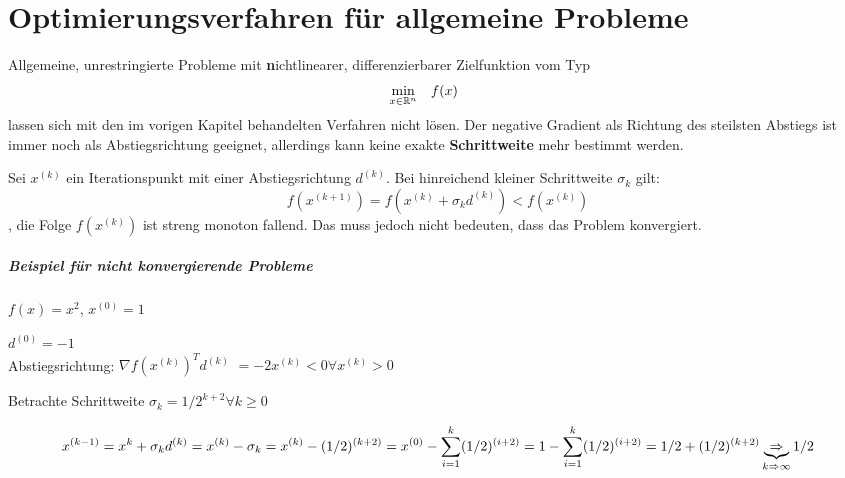 \chapter{Optimierungsverfahren für allgemeine Probleme}

Allgemeine, unrestringierte Probleme mit \textbf nichtlinearer, differenzierbarer Zielfunktion vom Typ
\begin{equation}
			\begin{aligned}
				\min_{x\in\mathbb R^n}
				& & & f(x) & & &
			\end{aligned}
\end{equation}
lassen sich mit den im vorigen Kapitel behandelten Verfahren nicht lösen. Der negative Gradient als Richtung des steilsten Abstiegs ist immer noch als Abstiegsrichtung geeignet, allerdings kann keine exakte \textbf {Schrittweite} mehr bestimmt werden.

Sei $x^{(k)}$ ein Iterationspunkt mit einer Abstiegsrichtung $d^{(k)}$. Bei hinreichend kleiner Schrittweite $\sigma_k$ gilt:
\begin{equation}
	f(x^{(k+1)}) = f(x^{(k)} + \sigma_kd^{(k)}) < f(x^{(k)})
\end{equation}
, die Folge ${f(x^{(k)})}$ ist streng monoton fallend. Das muss jedoch nicht bedeuten, dass das Problem konvergiert.

\paragraph{Beispiel für nicht konvergierende Probleme}

$f(x)= x^2$, $x^{(0)} = 1$



$d^{(0)} = -1$ \\
Abstiegsrichtung: $\nabla f(x^{(k)})^T d^{(k)}$
$=  -2x^{(k)} < 0 \forall x^{(k)} > 0$

Betrachte Schrittweite $\sigma_k = 1/2^{k+2} \forall k \geq 0$

\begin{equation}
x^{(k-1)} = x^k + \sigma_k d^{(k)} \\
= x^{(k)} - \sigma_k \\
= x^{(k)} - (1/2)^{(k+2)} \\
= x^{(0)} - \sum\limits_{i=1}^k (1/2)^{(i+2)} \\
= 1 - \sum\limits_{i=1}^k (1/2)^{(i+2)} \\
= 1/2 + (1/2)^{(k+2)}  \underbrace{\Rightarrow}_{k\Rightarrow \infty} 1/2
\end{equation}


